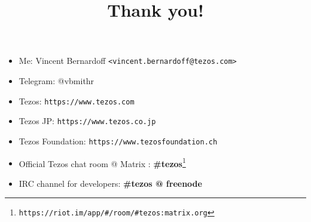\documentclass{slides}
\begin{document}
\begin{slide}
  \title{Thank you!}
  \begin{itemize}
    \item Me: Vincent Bernardoff \texttt{<vincent.bernardoff@tezos.com>}
    \item Telegram: @vbmithr
    \item Tezos: \texttt{https://www.tezos.com}
    \item Tezos JP: \texttt{https://www.tezos.co.jp}
    \item Tezos Foundation: \texttt{https://www.tezosfoundation.ch}
    \item Official Tezos chat room @ Matrix : \textbf{\#tezos}\footnote{\texttt{https://riot.im/app/\#/room/\#tezos:matrix.org}}
    \item IRC channel for developers: \textbf{\#tezos @ freenode}
  \end{itemize}
\end{slide}
\end{document}
